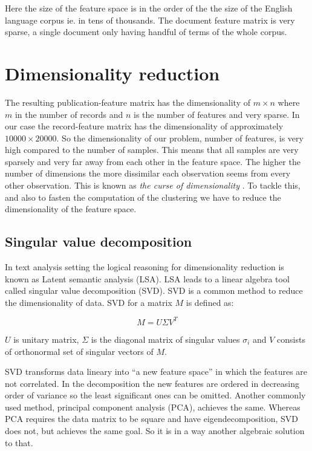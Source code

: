Here the size of the feature space is in the order of the the 
size of the English language corpus ie. in tens of thousands. The 
document feature matrix is very sparse, a single document only 
having handful of terms of the whole corpus.



\section{Dimensionality reduction}
\label{sec:dimensionalityreduction}
The resulting publication-feature matrix has the dimensionality 
of $m \times n$ where $m$ in 
the number of records and $n$ is the number of features and very 
sparse. In our case the record-feature matrix has the 
dimensionality of approximately $10000 \times 20000$. 
So the dimensionality of our problem, number of features, is very
high compared to the number of samples. This means that all
samples are very sparsely and very far away from each other in the 
feature space.
The higher the number of dimensions the more 
dissimilar each observation seems from every other observation. 
This is known as \emph{the curse of dimensionality} \cite{trunk_problem_1979}.
To tackle this, and also to fasten the computation of the 
clustering we have to reduce the dimensionality of the feature space.


\subsection{Singular value decomposition}
In text analysis setting the logical reasoning for dimensionality
reduction is known as Latent semantic analysis (LSA)\cite{dumais_latent_2004}.
LSA leads to a linear algebra tool called singular value 
decomposition (SVD). SVD is a common method to reduce the 
dimensionality of data. SVD for a matrix $M$ is defined as:

\begin{equation}
 M = U \Sigma V^T
\end{equation}

$U$ is unitary matrix, $\Sigma$ is the diagonal matrix of singular
values $\sigma_i$ and $V$ consists of orthonormal set of singular 
vectors of $M$.

SVD transforms data lineary into ``a new feature space'' in which the 
features are not correlated. In the decomposition the new features are 
ordered in decreasing order of variance so the least significant 
ones can be omitted. 
Another commonly used method, principal component analysis (PCA), 
achieves the same.
Whereas PCA requires the data matrix to be square and have 
eigendecomposition, SVD does not, but achieves the same goal.
So it is in a way another algebraic solution to that.


